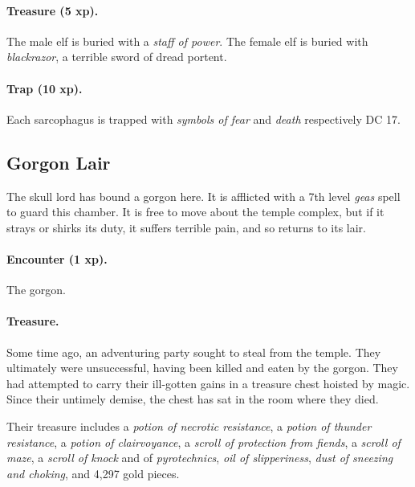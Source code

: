 \paragraph{Treasure (5 xp).}
The male elf is buried with a \textit{staff of power}. The female elf is buried with \textit{blackrazor}, a terrible sword of dread portent.

\paragraph{Trap (10 xp).}
Each sarcophagus is trapped with \textit{symbols of fear} and \textit{death} respectively DC 17.

\subsection{Gorgon Lair}
The skull lord has bound a gorgon here. It is afflicted with a 7th level \textit{geas} spell to guard this chamber. It is free to move about the temple complex, but if it strays or shirks its duty, it suffers terrible pain, and so returns to its lair.

\paragraph{Encounter (1 xp).}
The gorgon.

\paragraph{Treasure.}
Some time ago, an adventuring party sought to steal from the temple. They ultimately were unsuccessful, having been killed and eaten by the gorgon. They had attempted to carry their ill-gotten gains in a treasure chest hoisted by magic. Since their untimely demise, the chest has sat in the room where they died.

Their treasure includes a \textit{potion of necrotic resistance}, a \textit{potion of thunder resistance}, a \textit{potion of clairvoyance}, a \textit{scroll of protection from fiends}, a \textit{scroll of maze}, a \textit{scroll of knock} and of \textit{pyrotechnics}, \textit{oil of slipperiness}, \textit{dust of sneezing and choking}, and 4,297 gold pieces.
